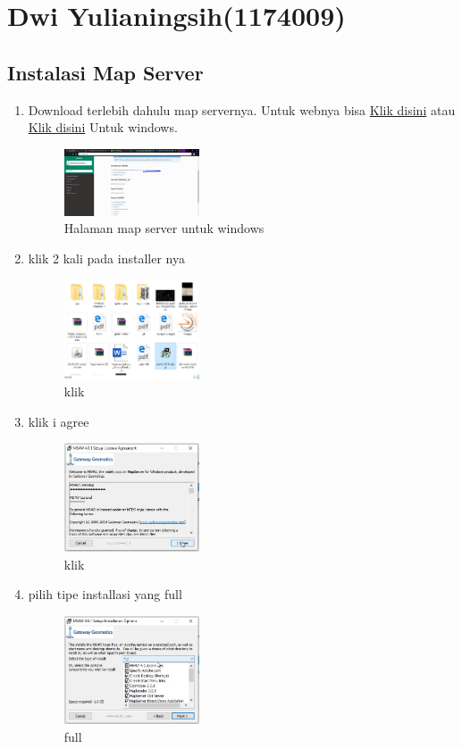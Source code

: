 \section{Dwi Yulianingsih(1174009)}
\subsection{Instalasi Map Server}
\begin{enumerate}
    \item Download terlebih dahulu map servernya. Untuk webnya bisa \href{https://mapserver.org/}{Klik disini} atau \href{https://ms4w.com/}{Klik disini} Untuk windows.
    \hfill\break
    \begin{figure}[H]
		\includegraphics[width=4cm]{figures/1174009/4/1.png}
		\centering
		\caption{Halaman map server untuk windows}
    \end{figure}
   
    \item klik 2 kali pada installer nya
    \hfill\break
    \begin{figure}[H]
		\includegraphics[width=4cm]{figures/1174009/4/2.png}
		\centering
		\caption{klik}
    \end{figure}
 
    \item klik i agree
   \begin{figure}[H]
		\includegraphics[width=4cm]{figures/1174009/4/3.png}
		\centering
		\caption{klik}
    \end{figure}

 \item pilih tipe installasi yang full
   \begin{figure}[H]
		\includegraphics[width=4cm]{figures/1174009/4/4.png}
		\centering
		\caption{full}
    \end{figure}


\end{enumerate}
